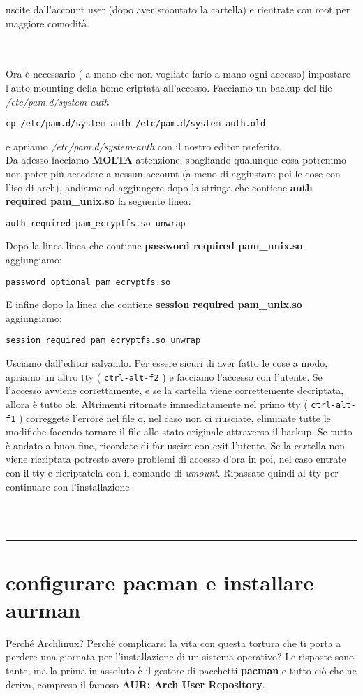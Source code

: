 \documentclass[twoside,italian]{book}
\newcommand{\nlinea}{
	\leavevmode
	\\
}
\newcommand{\centcode}[1]{
	
	\definecolor{centcode}{rgb}{0.5,0.1,0.1}
	
	\begin{center}
	 	\texttt{\textcolor{centcode}{#1}}
	\end{center}
	
	
}
\newcommand{\code}[1]{
	\texttt{\textcolor{code}{#1}}
}
\begin{document}
			uscite dall'account user (dopo aver smontato la cartella) e rientrate con root per maggiore comodità.
			\nlinea
			\nlinea
			Ora è necessario ( a meno che non vogliate farlo a mano ogni accesso) impostare l'auto-mounting della home criptata all'accesso.
			Facciamo un backup del file \textit{/etc/pam.d/system-auth} \centcode{cp /etc/pam.d/system-auth /etc/pam.d/system-auth.old}e apriamo \textit{/etc/pam.d/system-auth} con il nostro editor preferito.\\
			Da adesso facciamo \textbf{MOLTA} attenzione, sbagliando qualunque cosa potremmo non poter più accedere a nessun account (a meno di aggiustare poi le cose con l'iso di arch), andiamo ad aggiungere dopo la stringa che contiene \textbf{auth required pam\_unix.so} la seguente linea:
			\centcode{auth    required    pam\_ecryptfs.so unwrap}

			Dopo la linea linea che contiene \textbf{password required pam\_unix.so} aggiungiamo: \centcode{password    optional    pam\_ecryptfs.so}

			E infine dopo la linea che contiene \textbf{session required pam\_unix.so} aggiungiamo:\centcode{session required pam\_ecryptfs.so unwrap}
			Usciamo dall'editor salvando. Per essere sicuri di aver fatto le cose a modo, apriamo un altro tty (\code{ctrl-alt-f2}) e facciamo l'accesso con l'utente. Se l'accesso avviene correttamente, e se la cartella viene correttemente decriptata, allora è tutto ok. Altrimenti ritornate immediatamente nel primo tty (\code{ctrl-alt-f1})  correggete l'errore nel file o, nel caso non ci riusciate, eliminate tutte le modifiche facendo tornare il file allo stato originale attraverso il backup.
			Se tutto è andato a buon fine, ricordate di far uscire con exit l'utente. Se la cartella non viene ricriptata potreste avere problemi di accesso d'ora in poi, nel caso entrate con il tty e ricriptatela con il comando di \textit{umount}.
			Ripassate quindi al tty per continuare con l'installazione.




			\nlinea

			\nlinea

			\hrule


		\section{configurare pacman e installare aurman }

			Perché Archlinux? Perché complicarsi la vita con questa tortura che ti porta a perdere una giornata per l'installazione di un sistema operativo? Le risposte sono tante, ma la prima in assoluto è il gestore di pacchetti \textbf{pacman} e tutto ciò che ne deriva, compreso il famoso \textbf{AUR: Arch User Repository}.
\end{document}
